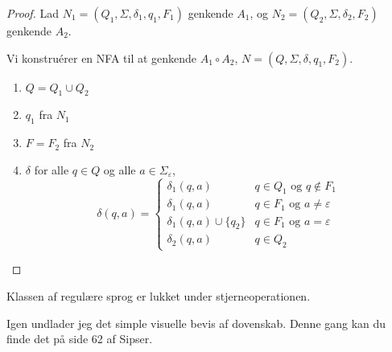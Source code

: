 \begin{proof}
  Lad $N_{1} =(Q_{1}, \Sigma, \delta_{1}, q_{1}, F_{1})$ genkende $A_{1}$, og $N_{2} = (Q_{2}, \Sigma, \delta_{2}, F_{2})$ genkende $A_{2}$.

  Vi konstruérer en NFA til at genkende $A_{1} \circ A_{2}$, $N = (Q, \Sigma, \delta, q_{1}, F_{2})$.
  \begin{enumerate}
    \item $Q = Q_{1} \cup Q_{2}$
    \item $q_{1}$ fra $N_{1}$
    \item $F = F_{2}$ fra $N_{2}$
    \item $\delta$ for alle $q \in Q$ og alle $a \in \Sigma_{\varepsilon}$,
          \begin{equation*}
\delta(q,a) = \begin{cases}
           \delta_{1}(q,a)& q \in Q_{1} \text{ og } q \notin F_{1}\\
           \delta_{1}(q,a)& q \in F_{1} \text{ og } a \neq \varepsilon \\

           \delta_{1}(q,a) \cup \{q_{2}\}& q \in F_{1} \text{ og } a = \varepsilon \\
           \delta_{2}(q,a) & q \in Q_{2}
         \end{cases}
          \end{equation*}
  \end{enumerate}
\end{proof}

\begin{theorem}
Klassen af regulære sprog er lukket under stjerneoperationen.
\end{theorem}


Igen undlader jeg det simple visuelle bevis af dovenskab. Denne gang kan du finde det på side 62 af Sipser.


